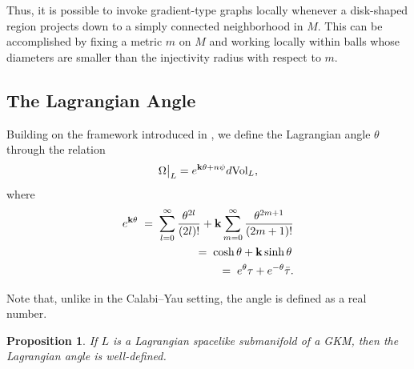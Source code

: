 \documentclass[12pt,letterpaper]{amsart}%
\newcounter{mycounter}
\numberwithin{mycounter}{section}
\theoremstyle{plain}
\newtheorem{proposition}[mycounter]{Proposition}
\numberwithin{equation}{section}
\theoremstyle{definition}
\begin{document}
Thus, it is possible to invoke gradient-type graphs locally whenever a disk-shaped region projects down to a simply connected neighborhood in $M.$   
This can be accomplished by fixing a metric $m$ on $M$ and working locally within balls whose diameters are smaller than the injectivity radius with respect to $m$.



\subsection{The Lagrangian Angle}
Building on the framework introduced in \cite{behrndt2008}, we define the Lagrangian angle $\theta$ through the relation
\begin{equation}\label{theta}
    \Omega\big|_L = e^{{\bf k}\theta+n\psi}d\textrm{Vol}_L, 
\end{equation}
where
\begin{align*}
    e^{{\bf k}\theta} \;=\; \sum_{l=0}^\infty \frac{\theta^{2l}}{(2l)!} + {\bf k}\sum_{m=0}^\infty \frac{\theta^{2m+1}}{(2m+1)!} \\\;=\; \cosh\theta+{\bf k}\sinh\theta\,
    \\\;=\;  e^{\theta}\tau+e^{-\theta}%
\bar{\tau}.
\end{align*}


    
Note that, unlike in the Calabi–Yau setting, the angle is defined as a real number.


\begin{proposition}\label{theta is defined}
    If $L$ is a Lagrangian spacelike submanifold of a GKM, then the Lagrangian angle is well-defined.
\end{proposition}
\end{document}

